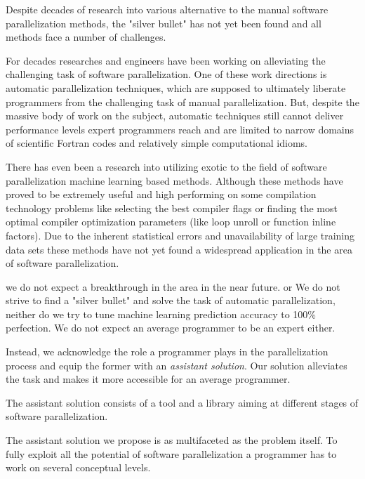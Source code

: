 \newline\null
\quad Despite decades of research into various alternative to the manual software parallelization methods, the "silver bullet" has not yet been found and all methods face a number of challenges.


For decades researches and engineers have been working on alleviating the challenging task of software parallelization. One of these work directions is automatic parallelization techniques, which are supposed to ultimately liberate programmers from the challenging task of manual parallelization. But, despite the massive body of work on the subject, automatic techniques still cannot deliver performance levels expert programmers reach and are limited to narrow domains of scientific Fortran codes and relatively simple computational idioms.\newline\null


There has even been a research into utilizing exotic to the field of software parallelization machine learning based methods. Although these methods have proved to be extremely useful and high performing on some compilation technology problems like selecting the best compiler flags or finding the most optimal compiler optimization parameters (like loop unroll or function inline factors). Due to the inherent statistical errors and unavailability of large training data sets these methods have not yet found a widespread application in the area of software parallelization. 



we do not expect a breakthrough in the area in the near future.  or
We do not strive to find a "silver bullet" and solve the task of automatic parallelization, neither do we try to tune machine learning prediction accuracy to 100\% perfection. We do not expect an average programmer to be an expert either. 

Instead, we acknowledge the role a programmer plays in the parallelization process and equip the former with an \textit{assistant solution}. Our solution alleviates the task and makes it more accessible for an average programmer. 

\quad The assistant solution consists of a tool and a library aiming at different stages of software parallelization. 


\quad The assistant solution we propose is as multifaceted as the problem itself. To fully exploit all the potential of software parallelization a programmer has to work on several conceptual levels. 

